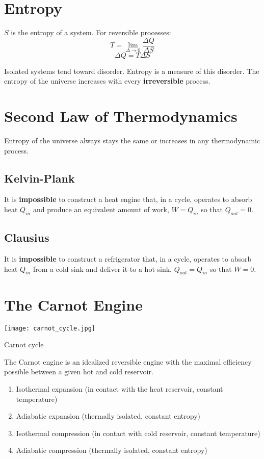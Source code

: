  \section{Entropy}
 $S$ is the entropy of a system.  For reversible processes:
 $$T=\lim_{\Delta \rightarrow 0} \frac{\Delta Q}{\Delta S}$$
 $$\Delta Q=T \Delta S$$

 Isolated systems tend toward disorder.  Entropy is a measure of this disorder.  The entropy of the universe increases with every \textbf{irreversible} process.


\section{Second Law of Thermodynamics}
Entropy of the universe always stays the same or increases in any thermodynamic process.
\subsection{Kelvin-Plank}
It is \textbf{impossible} to construct a heat engine that, in a cycle, operates to absorb heat $Q_{in}$ and produce an equivalent amount of work, $W=Q_{in}$ so that $Q_{out}=0$.
\subsection{Clausius}
It is \textbf{impossible} to construct a refrigerator that, in a cycle, operates to absorb heat $Q_{in}$ from a cold sink and deliver it to a hot sink, $Q_{out}=Q_{in}$ so that $W=0$.


\section{The Carnot Engine}

\begin{marginfigure}[0pt]
  \texttt{[image: carnot\_cycle.jpg]}
  \caption{Carnot cycle}
  \label{fig:marginfig}
\end{marginfigure}

The Carnot engine is an idealized reversible engine with the maximal efficiency possible between a given hot and cold reservoir. 
\begin{enumerate}
\item Isothermal expansion  (in contact with the heat reservoir, constant temperature)
\item Adiabatic expansion  (thermally isolated, constant entropy)
\item Isothermal compression  (in contact with cold reservoir, constant temperature)
\item Adiabatic compression  (thermally isolated, constant entropy)
\end{enumerate}


